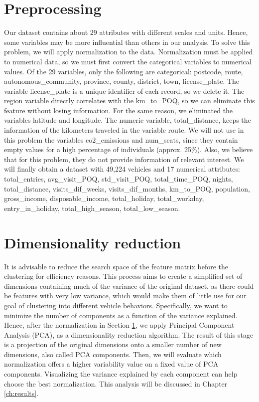 \section{Preprocessing} \label{sec:preprocessing}

Our dataset contains about 29 attributes with different scales and units. Hence, some variables may be more influential than others in our analysis. To solve this problem, we will apply normalization to the data. Normalization must be applied to numerical data, so we must first convert the categorical variables to numerical values. Of the 29 variables, only the following are categorical: postcode, route, autonomous\_community, province, county, district, town, license\_plate. The variable license\_plate is a unique identifier of each record, so we delete it. The region variable directly correlates with the km\_to\_POQ, so we can eliminate this feature without losing information. For the same reason, we eliminated the variables latitude and longitude. The numeric variable, total\_distance, keeps the information of the kilometers traveled in the variable route. We will not use in this problem the variables co2\_emissions and num\_seats, since they contain empty values for a high percentage of individuals (approx. 25\%). Also, we believe that for this problem, they do not provide information of relevant interest. We will finally obtain a dataset with 49,224 vehicles and 17 numerical attributes: total\_entries, avg\_visit\_POQ, std\_visit\_POQ, total\_time\_POQ, nights, total\_distance, visits\_dif\_weeks, visits\_dif\_months, km\_to\_POQ, population, gross\_income, disposable\_income, total\_holiday, total\_workday, entry\_in\_holiday, total\_high\_season, total\_low\_season. 

\section{Dimensionality reduction} 

It is advisable to reduce the search space of the feature matrix before the clustering for efficiency reasons. This process aims to create a simplified set of dimensions containing much of the variance of the original dataset, as there could be features with very low variance, which would make them of little use for our goal of clustering into different vehicle behaviors. Specifically, we want to minimize the number of components as a function of the variance explained. Hence, after the normalization in Section \ref{sec:preprocessing}, we apply Principal Component Analysis (PCA), as a dimensionality reduction algorithm. The result of this stage is a projection of the original dimensions onto a smaller number of new dimensions, also called PCA components. Then, we will evaluate which normalization offers a higher variability value on a fixed value of PCA components. Visualizing the variance explained by each component can help choose the best normalization. This analysis will be discussed in Chapter \ref{ch:results}.

